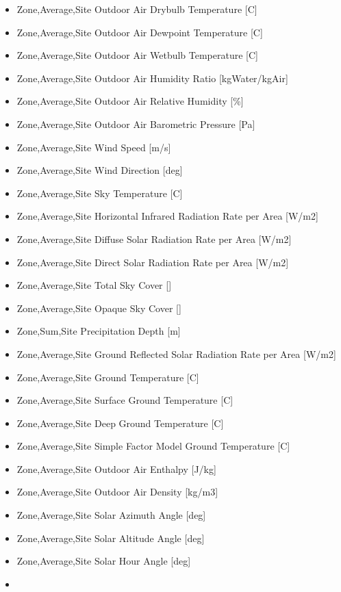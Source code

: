 \begin{itemize}
\item
  Zone,Average,Site Outdoor Air Drybulb Temperature {[}C{]}
\item
  Zone,Average,Site Outdoor Air Dewpoint Temperature {[}C{]}
\item
  Zone,Average,Site Outdoor Air Wetbulb Temperature {[}C{]}
\item
  Zone,Average,Site Outdoor Air Humidity Ratio {[}kgWater/kgAir{]}
\item
  Zone,Average,Site Outdoor Air Relative Humidity {[}\%{]}
\item
  Zone,Average,Site Outdoor Air Barometric Pressure {[}Pa{]}
\item
  Zone,Average,Site Wind Speed {[}m/s{]}
\item
  Zone,Average,Site Wind Direction {[}deg{]}
\item
  Zone,Average,Site Sky Temperature {[}C{]}
\item
  Zone,Average,Site Horizontal Infrared Radiation Rate per Area {[}W/m2{]}
\item
  Zone,Average,Site Diffuse Solar Radiation Rate per Area {[}W/m2{]}
\item
  Zone,Average,Site Direct Solar Radiation Rate per Area {[}W/m2{]}
\item
  Zone,Average,Site Total Sky Cover []
\item
  Zone,Average,Site Opaque Sky Cover []
\item
  Zone,Sum,Site Precipitation Depth {[}m{]}
\item
  Zone,Average,Site Ground Reflected Solar Radiation Rate per Area {[}W/m2{]}
\item
  Zone,Average,Site Ground Temperature {[}C{]}
\item
  Zone,Average,Site Surface Ground Temperature {[}C{]}
\item
  Zone,Average,Site Deep Ground Temperature {[}C{]}
\item
  Zone,Average,Site Simple Factor Model Ground Temperature {[}C{]}
\item
  Zone,Average,Site Outdoor Air Enthalpy {[}J/kg{]}
\item
  Zone,Average,Site Outdoor Air Density {[}kg/m3{]}
\item
  Zone,Average,Site Solar Azimuth Angle {[}deg{]}
\item
  Zone,Average,Site Solar Altitude Angle {[}deg{]}
\item
  Zone,Average,Site Solar Hour Angle {[}deg{]}
\item

\end{itemize}
